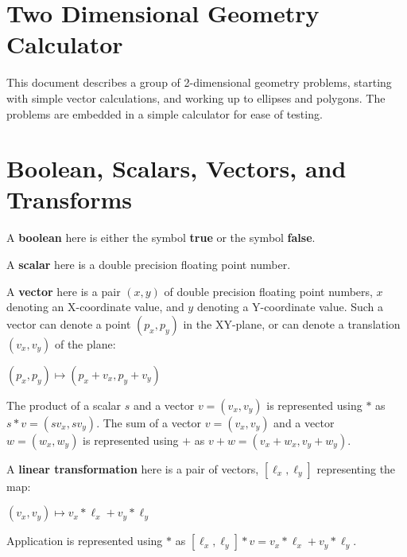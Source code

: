 \documentclass[12pt]{article}
\begin{document}
\newcommand{\header}[1]{\underline{\bf #1}}
\newcommand{\file}[1]{{\bf #1}}
\newcommand{\blankpage}{\newpage\vspace*{3.5in}%
    \centerline{\Large This Page is Intentionally Left Blank}}
\setlength{\parindent}{0.0in}
\setlength{\parskip}{1ex}
\newcommand{\key}[1]{{\bf #1}}
\newcommand{\TT}[1]{{\tt \bfseries #1}}
\newcommand{\EOL}{\penalty \exhyphenpenalty}
\newtheorem{definition}{Definition}[section]
\newtheorem{lemma}[definition]{Lemma}
\newtheorem{corollary}[definition]{Corollary}
\newtheorem{theorem}[definition]{Theorem}
\newtheorem{algorithm}[definition]{Algorithm}
\newenvironment{indpar}[1]%
    {\begin{list}{}{\setlength{\leftmargin}{#1}}\item[]}%
    {\end{list}}

\section{Two Dimensional Geometry Calculator}
This document describes a group of 2-dimensional geometry problems,
starting with simple vector calculations, and working up to
ellipses and polygons.
The problems are embedded in a simple calculator for ease of
testing.

\section{Boolean, Scalars, Vectors, and Transforms}
A \key{boolean} here is either the symbol \key{true} or the symbol \key{false}.

A \key{scalar} here is a double precision floating point number.

A \key{vector} here is a pair $(x,y)$ of double precision floating point
numbers, $x$ denoting an X-coordinate value, and $y$ denoting a
Y-coordinate value.  Such a vector can denote a point $(p_x,p_y)$ in the
XY-plane, or can denote a translation $(v_x,v_y)$ of the plane: \\
\centerline{$(p_x,p_y) \longmapsto (p_x+v_x,p_y+v_y)$}

The product of a scalar $s$ and a vector $v=(v_x,v_y)$ is represented using
$*$ as $s*v = (sv_x,sv_y)$.
The sum of a vector $v=(v_x,v_y)$ and a vector $w=(w_x,w_y)$ is
represented using $+$ as $v+w = (v_x+w_x,v_y+w_y)$.

A \key{linear transformation} here is a pair of vectors, $[\ell_x,\ell_y]$
representing the map:
\centerline{$(v_x,v_y) \longmapsto v_x*\ell_x+v_y*\ell_y$}
Application is represented using
$*$ as $[\ell_x,\ell_y]*v=v_x*\ell_x+v_y*\ell_y$.
\end{document}
